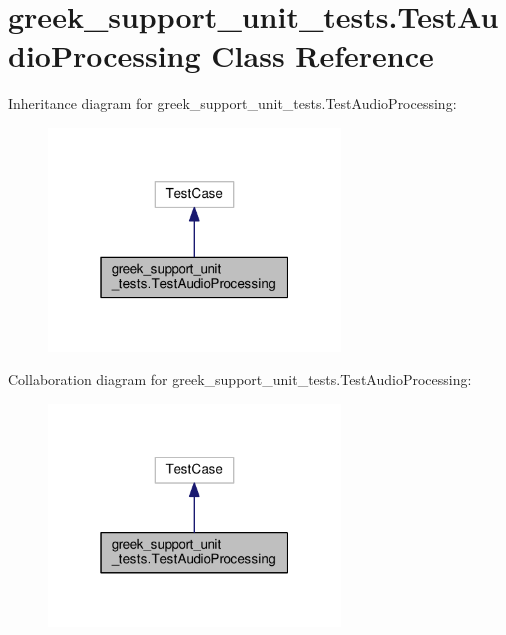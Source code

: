 \hypertarget{classgreek__support__unit__tests_1_1TestAudioProcessing}{\section{greek\-\_\-support\-\_\-unit\-\_\-tests.\-Test\-Audio\-Processing Class Reference}
\label{classgreek__support__unit__tests_1_1TestAudioProcessing}
}


Inheritance diagram for greek\-\_\-support\-\_\-unit\-\_\-tests.\-Test\-Audio\-Processing\-:
\nopagebreak
\begin{figure}[H]
\begin{center}
\leavevmode
\includegraphics[width=220pt]{classgreek__support__unit__tests_1_1TestAudioProcessing__inherit__graph}
\end{center}
\end{figure}


Collaboration diagram for greek\-\_\-support\-\_\-unit\-\_\-tests.\-Test\-Audio\-Processing\-:
\nopagebreak
\begin{figure}[H]
\begin{center}
\leavevmode
\includegraphics[width=220pt]{classgreek__support__unit__tests_1_1TestAudioProcessing__coll__graph}
\end{center}
\end{figure}
